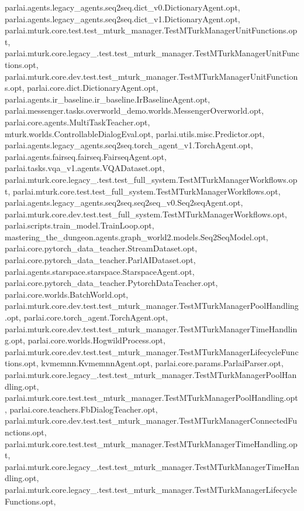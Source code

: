 parlai.\+agents.\+legacy\+\_\+agents.\+seq2seq.\+dict\+\_\+v0.\+Dictionary\+Agent.\+opt, parlai.\+agents.\+legacy\+\_\+agents.\+seq2seq.\+dict\+\_\+v1.\+Dictionary\+Agent.\+opt, parlai.\+mturk.\+core.\+test.\+test\+\_\+mturk\+\_\+manager.\+Test\+M\+Turk\+Manager\+Unit\+Functions.\+opt, parlai.\+mturk.\+core.\+legacy\+\_.\+test.\+test\+\_\+mturk\+\_\+manager.\+Test\+M\+Turk\+Manager\+Unit\+Functions.\+opt, parlai.\+mturk.\+core.\+dev.\+test.\+test\+\_\+mturk\+\_\+manager.\+Test\+M\+Turk\+Manager\+Unit\+Functions.\+opt, parlai.\+core.\+dict.\+Dictionary\+Agent.\+opt, parlai.\+agents.\+ir\+\_\+baseline.\+ir\+\_\+baseline.\+Ir\+Baseline\+Agent.\+opt, parlai.\+messenger.\+tasks.\+overworld\+\_\+demo.\+worlds.\+Messenger\+Overworld.\+opt, parlai.\+core.\+agents.\+Multi\+Task\+Teacher.\+opt, mturk.\+worlds.\+Controllable\+Dialog\+Eval.\+opt, parlai.\+utils.\+misc.\+Predictor.\+opt, parlai.\+agents.\+legacy\+\_\+agents.\+seq2seq.\+torch\+\_\+agent\+\_\+v1.\+Torch\+Agent.\+opt, parlai.\+agents.\+fairseq.\+fairseq.\+Fairseq\+Agent.\+opt, parlai.\+tasks.\+vqa\+\_\+v1.\+agents.\+V\+Q\+A\+Dataset.\+opt, parlai.\+mturk.\+core.\+legacy\+\_.\+test.\+test\+\_\+full\+\_\+system.\+Test\+M\+Turk\+Manager\+Workflows.\+opt, parlai.\+mturk.\+core.\+test.\+test\+\_\+full\+\_\+system.\+Test\+M\+Turk\+Manager\+Workflows.\+opt, parlai.\+agents.\+legacy\+\_\+agents.\+seq2seq.\+seq2seq\+\_\+v0.\+Seq2seq\+Agent.\+opt, parlai.\+mturk.\+core.\+dev.\+test.\+test\+\_\+full\+\_\+system.\+Test\+M\+Turk\+Manager\+Workflows.\+opt, parlai.\+scripts.\+train\+\_\+model.\+Train\+Loop.\+opt, mastering\+\_\+the\+\_\+dungeon.\+agents.\+graph\+\_\+world2.\+models.\+Seq2\+Seq\+Model.\+opt, parlai.\+core.\+pytorch\+\_\+data\+\_\+teacher.\+Stream\+Dataset.\+opt, parlai.\+core.\+pytorch\+\_\+data\+\_\+teacher.\+Parl\+A\+I\+Dataset.\+opt, parlai.\+agents.\+starspace.\+starspace.\+Starspace\+Agent.\+opt, parlai.\+core.\+pytorch\+\_\+data\+\_\+teacher.\+Pytorch\+Data\+Teacher.\+opt, parlai.\+core.\+worlds.\+Batch\+World.\+opt, parlai.\+mturk.\+core.\+dev.\+test.\+test\+\_\+mturk\+\_\+manager.\+Test\+M\+Turk\+Manager\+Pool\+Handling.\+opt, parlai.\+core.\+torch\+\_\+agent.\+Torch\+Agent.\+opt, parlai.\+mturk.\+core.\+dev.\+test.\+test\+\_\+mturk\+\_\+manager.\+Test\+M\+Turk\+Manager\+Time\+Handling.\+opt, parlai.\+core.\+worlds.\+Hogwild\+Process.\+opt, parlai.\+mturk.\+core.\+dev.\+test.\+test\+\_\+mturk\+\_\+manager.\+Test\+M\+Turk\+Manager\+Lifecycle\+Functions.\+opt, kvmemnn.\+Kvmemnn\+Agent.\+opt, parlai.\+core.\+params.\+Parlai\+Parser.\+opt, parlai.\+mturk.\+core.\+legacy\+\_.\+test.\+test\+\_\+mturk\+\_\+manager.\+Test\+M\+Turk\+Manager\+Pool\+Handling.\+opt, parlai.\+mturk.\+core.\+test.\+test\+\_\+mturk\+\_\+manager.\+Test\+M\+Turk\+Manager\+Pool\+Handling.\+opt, parlai.\+core.\+teachers.\+Fb\+Dialog\+Teacher.\+opt, parlai.\+mturk.\+core.\+dev.\+test.\+test\+\_\+mturk\+\_\+manager.\+Test\+M\+Turk\+Manager\+Connected\+Functions.\+opt, parlai.\+mturk.\+core.\+test.\+test\+\_\+mturk\+\_\+manager.\+Test\+M\+Turk\+Manager\+Time\+Handling.\+opt, parlai.\+mturk.\+core.\+legacy\+\_.\+test.\+test\+\_\+mturk\+\_\+manager.\+Test\+M\+Turk\+Manager\+Time\+Handling.\+opt, parlai.\+mturk.\+core.\+legacy\+\_.\+test.\+test\+\_\+mturk\+\_\+manager.\+Test\+M\+Turk\+Manager\+Lifecycle\+Functions.\+opt, 